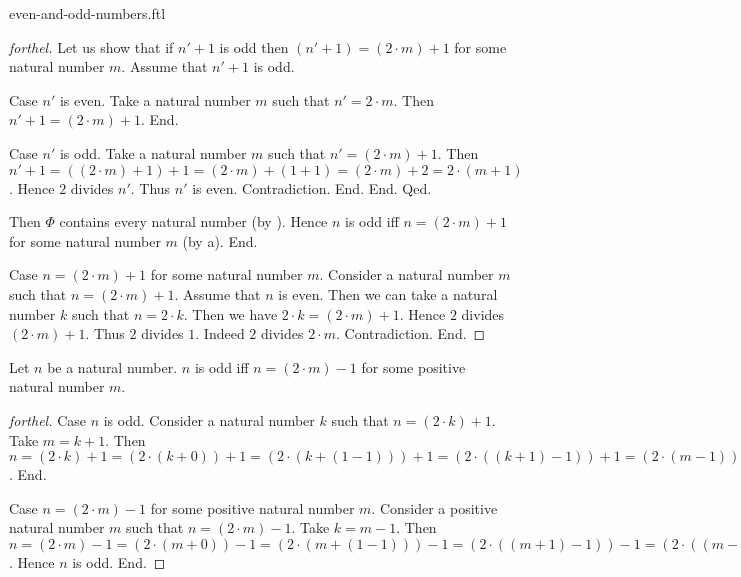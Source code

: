\documentclass{naproche-library}
\begin{document}
\begin{smodule}{even-and-odd-numbers.ftl}
\begin{proof}[forthel]
        Let us show that if $n' + 1$ is odd then $(n' + 1) = (2 \cdot m) + 1$ for some natural number $m$.
          Assume that $n' + 1$ is odd.

          Case $n'$ is even.
            Take a natural number $m$ such that $n' = 2 \cdot m$.
            Then $n' + 1 = (2 \cdot m) + 1$.
          End.

          Case $n'$ is odd.
            Take a natural number $m$ such that $n' = (2 \cdot m) + 1$.
            Then $n' + 1
              = ((2 \cdot m) + 1) + 1
              = (2 \cdot m) + (1 + 1)
              = (2 \cdot m) + 2
              = 2 \cdot (m + 1)$.
            Hence $2$ divides $n'$.
            Thus $n'$ is even.
            Contradiction.
          End.
        End.
      Qed.

      Then $\Phi$ contains every natural number (by ).
      Hence $n$ is odd iff $n = (2 \cdot m) + 1$ for some natural number $m$ (by a).
    End.

    Case $n = (2 \cdot m) + 1$ for some natural number $m$.
      Consider a natural number $m$ such that $n = (2 \cdot m) + 1$.
      Assume that $n$ is even.
      Then we can take a natural number $k$ such that $n = 2 \cdot k$.
      Then we have $2 \cdot k = (2 \cdot m) + 1$.
      Hence $2$ divides $(2 \cdot m) + 1$.
      Thus $2$ divides $1$.
      Indeed $2$ divides $2 \cdot m$.
      Contradiction.
    End.
  \end{proof}

  \begin{proposition}[forthel,id=ARITHMETIC_15_1023652154254789]
    Let $n$ be a natural number.
    $n$ is odd iff $n = (2 \cdot m) - 1$ for some positive natural number $m$.
  \end{proposition}
  \begin{proof}[forthel]
    Case $n$ is odd.
      Consider a natural number $k$ such that $n = (2 \cdot k) + 1$.
      Take $m = k + 1$.
      Then $n
        = (2 \cdot k) + 1
        = (2 \cdot (k + 0)) + 1
        = (2 \cdot (k + (1 - 1))) + 1
        = (2 \cdot ((k + 1) - 1)) + 1
        = (2 \cdot (m - 1)) + 1
        = ((2 \cdot m) - (2 \cdot 1)) + 1
        = ((2 \cdot m) - 2) + 1
        = (2 \cdot m) - 1$.
    End.

    Case $n = (2 \cdot m) - 1$ for some positive natural number $m$.
      Consider a positive natural number $m$ such that $n = (2 \cdot m) - 1$.
      Take $k = m - 1$.
      Then $n
        = (2 \cdot m) - 1
        = (2 \cdot (m + 0)) - 1
        = (2 \cdot (m + (1 - 1))) - 1
        = (2 \cdot ((m + 1) - 1)) - 1
        = (2 \cdot ((m - 1) + 1)) - 1
        = (2 \cdot (k + 1)) - 1
        = ((2 \cdot k) + (2 \cdot 1)) - 1
        = ((2 \cdot k) + 2) - 1
        = (2 \cdot k) + (2 - 1)
        = (2 \cdot k) + 1$.
      Hence $n$ is odd.
    End.
  \end{proof}



\end{smodule}
\end{document}
